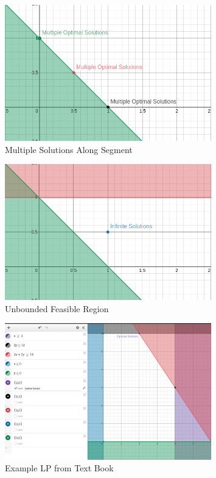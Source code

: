 \documentclass[12pt, letter]{article}
\begin{document}
\begin{figure}[h]
	\centering
	\includegraphics[width=0.8\textwidth]{mult-solns}
	\caption{Multiple Solutions Along Segment}
	\label{fig:mult-soln}
\end{figure}

\begin{figure}[h]
	\centering
	\includegraphics[width=0.8\textwidth]{inf_solns}
	\caption{Unbounded Feasible Region}
	\label{fig:inf-solns}
\end{figure}

\begin{figure}[h]
	\centering
	\includegraphics[width=0.8\textwidth]{textbook-lp}
	\caption{Example LP from Text Book}
	\label{fig:textbook-lp}
\end{figure}
\end{document}

